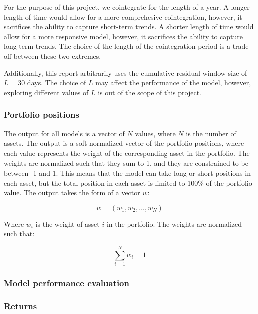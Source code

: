 \documentclass[12pt]{article}
\begin{document}
For the purpose of this project, we cointegrate for the length of a year. A longer length of time would allow for a more comprehesive cointegration, however, it sacrifices the ability to capture short-term trends. A shorter length of time would allow for a more responsive model, however, it sacrifices the ability to capture long-term trends. The choice of the length of the cointegration period is a trade-off between these two extremes.

Additionally, this report arbitrarily uses the cumulative residual window size of $L=30$ days. The choice of $L$ may affect the performance of the model, however, exploring different values of $L$ is out of the scope of this project.

\subsubsection{Portfolio positions}

The output for all models is a vector of $N$ values, where $N$ is the number of assets. The output is a soft normalized vector of the portfolio positions, where each value represents the weight of the corresponding asset in the portfolio. The weights are normalized such that they sum to 1, and they are constrained to be between -1 and 1. This means that the model can take long or short positions in each asset, but the total position in each asset is limited to 100\% of the portfolio value. The output takes the form of a vector $w$:

\begin{equation}
    w = (w_1, w_2, \ldots, w_N)
    \label{eq:portfolio_weights}
\end{equation}

Where $w_i$ is the weight of asset $i$ in the portfolio. The weights are normalized such that:

\begin{equation}
    \sum_{i=1}^{N} w_i = 1
    \label{eq:portfolio_weights_normalization}
\end{equation}

\subsubsection{Model performance evaluation} 

\subsubsection*{Returns}
\end{document}
